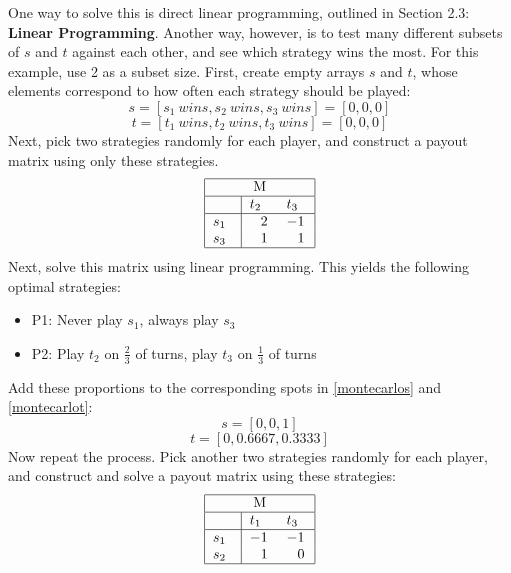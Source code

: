 \documentclass[11pt]{article}
\begin{document}
One way to solve this is direct linear programming, outlined in Section
2.3: \textbf{Linear Programming}. Another way, however, is to test many
different subsets of $s$ and $t$ against each other, and see which
strategy wins the most. For this example, use 2 as a subset
size. First, create empty arrays $s$ and $t$, whose elements correspond
to how often each strategy should be played:
\begin{equation*}
\label{montecarlos}
s = [s_1\:wins, s_2\:wins, s_3\:wins] = [0,0,0]
\end{equation*}
\begin{equation*}
\label{montecarlot}
t = [t_1\:wins, t_2\:wins, t_3\:wins] = [0,0,0]
\end{equation*}
Next, pick two strategies randomly for each player, and construct a payout
matrix using only these strategies.
\begin{equation*}
\begin{tabular}{ |p{0.5cm}|p{0.5cm} p{0.5cm}|  }
\hline
\multicolumn{3}{|c|}{M} \\
\hline
\textcolor{white}{.}& $t_2$ & $t_3$\\
\hline
$s_1$ & $\textcolor{white}{-}$2 & $-1$\\
$s_3$ & $\textcolor{white}{-}$1 & $\textcolor{white}{-}$1\\
\hline
\end{tabular}
\end{equation*}
Next, solve this matrix using linear programming. This yields the
following optimal strategies:
\begin{itemize}
\item P1: Never play $s_1$, always play $s_3$
\item P2: Play $t_2$ on $\frac{2}{3}$ of turns, play $t_3$ on $\frac{1}{3}$ of turns
\end{itemize}
Add these proportions to the corresponding spots in \eqref{montecarlos} and \eqref{montecarlot}:
\begin{equation*}
s = [0,0,1]
\end{equation*}
\begin{equation*}
t = [0,0.6667,0.3333]
\end{equation*}
Now repeat the process. Pick another two strategies randomly for each player, and construct and solve a payout matrix using these strategies:
\begin{equation*}
\begin{tabular}{ |p{0.5cm}|p{0.5cm} p{0.5cm}|  }
\hline
\multicolumn{3}{|c|}{M} \\
\hline
\textcolor{white}{.}& $t_1$ & $t_3$\\
\hline
$s_1$ & $-1$ & $-1$\\
$s_2$ & $\textcolor{white}{-}$1 & $\textcolor{white}{-}$0\\
\hline
\end{tabular}
\end{equation*}
\end{document}
